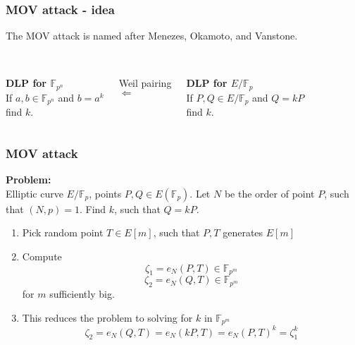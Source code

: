 \documentclass{beamer}
\begin{document}
\begin{frame}
\frametitle{MOV attack - idea}
The MOV attack is named after Menezes, Okamoto, and Vanstone. \\ ~ \\ \pause

\begin{columns}[c] %

\begin{center}
\textbf{DLP for $\mathbb{F}_{p^n}$} \\

If $a, b \in \mathbb{F}_{p^n}$ and $b=a^k$\\
find $k$. \\
\end{center}

\begin{center}
Weil pairing \\
{$\Longleftarrow$}
\end{center}

\begin{center}
\textbf{DLP for $E/\mathbb{F}_p$} \\
If $P, Q \in E/\mathbb{F}_{p}$ and $Q=kP$ \\
find $k$.
\end{center}
\end{columns}

\end{frame}


\begin{frame}
\frametitle{MOV attack}
\textbf{Problem:} \\
Elliptic curve $E/\mathbb{F}_p$, points $P,Q \in E(\mathbb{F}_p)$.
Let $N$ be the order of point $P$, such that $(N,p) = 1$. Find $k$, such that $Q = kP$.

\begin{enumerate}
    \item Pick random point $T \in E[m]$, such that $P, T$ generates $E[m]$ \pause
    \item Compute $$\zeta_1 = e_N(P,T) \in \mathbb{F}_{p^m}$$ 
    $$\zeta_2 = e_N(Q,T) \in \mathbb{F}_{p^m}$$ for $m$ sufficiently big. \pause
    \item This reduces the problem to solving for $k$ in $\mathbb{F}_{p^m}$
     $$\zeta_2 = e_N(Q,T) = e_N(kP, T) = e_N(P,T)^k = \zeta_1^k $$ 
\end{enumerate}
\end{frame}
\end{document}
